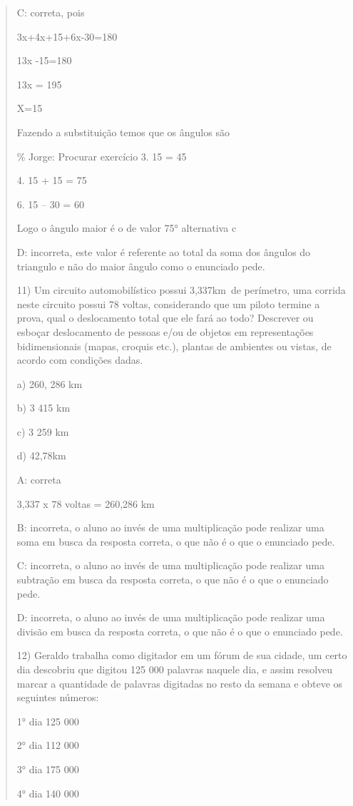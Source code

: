 \begin{quote}
\begin{escolha}
C: correta, pois

3x+4x+15+6x-30=180

13x -15=180

13x = 195

X=15

Fazendo a substituição temos que os ângulos são

\% Jorge: Procurar exercício 3. 15 = 45

4. 15 + 15 = 75

6. 15 -- 30 = 60

Logo o ângulo maior é o de valor 75° alternativa c

D: incorreta, este valor é referente ao total da soma dos ângulos do
triangulo e não do maior ângulo como o enunciado pede.

11) Um circuito automobilístico possui 3,337km~de perímetro, uma corrida
neste circuito possui 78 voltas, considerando que um piloto termine a
prova, qual o deslocamento total que ele fará ao todo? Descrever ou
esboçar deslocamento de pessoas e/ou de objetos em representações
bidimensionais (mapas, croquis etc.), plantas de ambientes ou vistas, de
acordo com condições dadas.

a) 260, 286 km

b) 3 415 km

c) 3 259 km

d) 42,78km

A: correta

3,337 x 78 voltas = 260,286 km

B: incorreta, o aluno ao invés de uma multiplicação pode realizar uma
soma em busca da resposta correta, o que não é o que o enunciado pede.

C: incorreta, o aluno ao invés de uma multiplicação pode realizar uma
subtração em busca da resposta correta, o que não é o que o enunciado
pede.

D: incorreta, o aluno ao invés de uma multiplicação pode realizar uma
divisão em busca da resposta correta, o que não é o que o enunciado
pede.

12) Geraldo trabalha como digitador em um fórum de sua cidade, um certo
dia descobriu que digitou 125 000 palavras naquele dia, e assim resolveu
marcar a quantidade de palavras digitadas no resto da semana e obteve os
seguintes números:

1° dia 125 000

2° dia 112 000

3° dia 175 000

4° dia 140 000


\end{escolha}
\end{quote}
